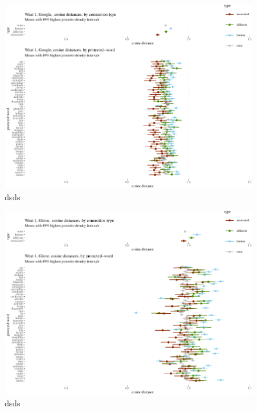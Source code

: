 \documentclass[
  10pt,
  dvipsnames,enabledeprecatedfontcommands]{scrartcl}
\begin{document}
\begin{figure}


\begin{center}\includegraphics[width=1.1\linewidth]{paperDraft6_files/figure-latex/unnamed-chunk-4-1} \end{center}
\caption{dsds}
\label{fig:weat1google}
\end{figure}

\begin{figure}


\begin{center}\includegraphics[width=1.1\linewidth]{paperDraft6_files/figure-latex/unnamed-chunk-5-1} \end{center}
\caption{dsds}
\label{fig:weat1glove}
\end{figure}
\end{document}
